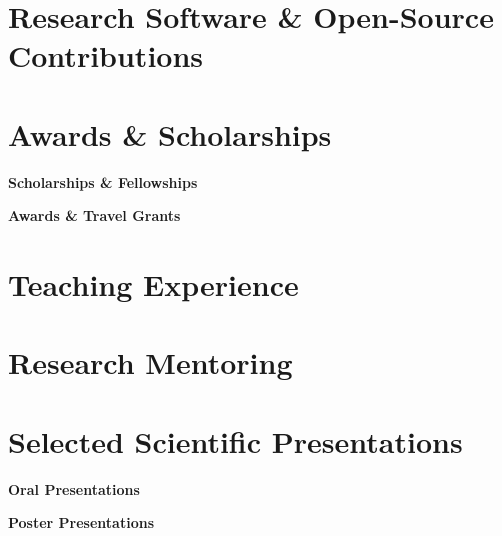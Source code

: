 \documentclass[10pt,a4paper]{article}
\newcommand{\cvpubcategory}[1]{%
    \Needspace{3\baselineskip}
    \vspace{3pt}
    {\normalsize\bfseries #1\par}
    \vspace{3pt}
}
\begin{document}
\pubFaceFamiliarity
\pubPNPLTwentySix
\pubMEGFoundationRoadmap
\pubCoordRegion
\pubBerradaCognition

\section{Research Software \& Open-Source Contributions}
\softwareMNE
\softwareCoCoPipe
\softwareCoordRegion
\softwareJamica

\section{Awards \& Scholarships}

\cvpubcategory{Scholarships \& Fellowships}

\awardFacultyMedicine
\awardImbizo
\awardUniquePhD
\awardCSMerit
\awardCIRCA
\awardCerebrum
\awardUniqueMSc
\awardCSInternational
\awardMitacs

\cvpubcategory{Awards \& Travel Grants}

\awardCosyne
\awardUniqueTravel
\awardRBIQ
\awardMAINPoster
\awardIEEEAmbassador
\awardSupcomChallenge
\awardGreenIsland


\section{Teaching Experience}

\teachingPathfindersInstructor
\teachingAbInt
\teachingPSYTwoOOEight
\teachingPSYTwoOOSeven
\teachingArabsNeuro


\section{Research Mentoring}

\mentoringMaryem
\mentoringSyrine
\mentoringFouad
\mentoringAlexandre
\mentoringMehdi
\mentoringAnis
\mentoringMeriem

\section{Selected Scientific Presentations}

\cvpubcategory{Oral Presentations}

\presentationMNEDenoise
\presentationCIRCA
\presentationScaling


\cvpubcategory{Poster Presentations}

\presentationNAISys
\presentationCCNTwentyFour
\presentationCosyneTwentyFour
\presentationMAIN
\end{document}
